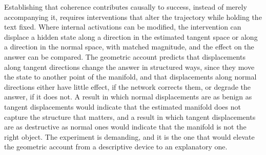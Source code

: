 Establishing that coherence contributes causally to success, instead of merely accompanying it, requires interventions that alter the trajectory while holding the text fixed. Where internal activations can be modified, the intervention can displace a hidden state along a direction in the estimated tangent space or along a direction in the normal space, with matched magnitude, and the effect on the answer can be compared. The geometric account predicts that displacements along tangent directions change the answer in structured ways, since they move the state to another point of the manifold, and that displacements along normal directions either have little effect, if the network corrects them, or degrade the answer, if it does not. A result in which normal displacements are as benign as tangent displacements would indicate that the estimated manifold does not capture the structure that matters, and a result in which tangent displacements are as destructive as normal ones would indicate that the manifold is not the right object. The experiment is demanding, and it is the one that would elevate the geometric account from a descriptive device to an explanatory one.
